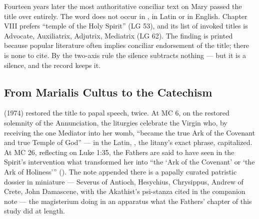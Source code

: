 Fourteen years later the most authoritative conciliar text on Mary passed
the title over entirely. The word  does not occur in , in Latin or in English. Chapter VIII prefers ``temple of the Holy
Spirit'' (LG 53), and its list of invoked titles is Advocate, Auxiliatrix,
Adjutrix, Mediatrix (LG 62). The finding is printed because popular
literature often implies conciliar endorsement of the title; there is none to
cite. By the two-axis rule the silence subtracts nothing --- but it is a
silence, and the record keeps it.

\subsection{From Marialis Cultus to the Catechism}

 (1974) restored the title to papal speech, twice. At
MC 6, on the restored solemnity of the Annunciation, the liturgies celebrate
the Virgin who, by receiving the one Mediator into her womb, ``became the
true Ark of the Covenant and true Temple of God'' --- in the Latin,
, the litany's exact phrase, capitalized. At MC 26,
reflecting on Luke 1:35, the Fathers are said to have seen in the Spirit's
intervention what transformed her into ``the `Ark of the Covenant' or `the
Ark of Holiness''' (). The note
appended there is a papally curated patristic dossier in miniature ---
Severus of Antioch, Hesychius, Chrysippus, Andrew of Crete, John Damascene,
with the Akathist's psi-stanza cited in the companion note --- the
magisterium doing in an apparatus what the Fathers' chapter of this study
did at length.

